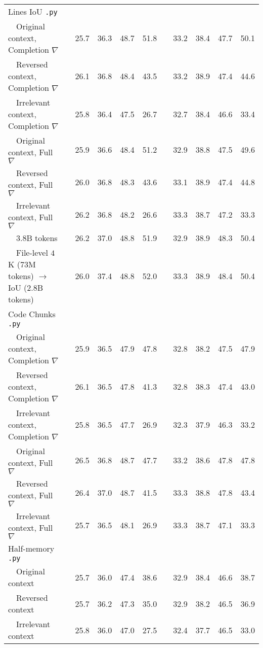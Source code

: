 \begin{table}[H]
{\begin{tabular}{lc cc>{\columncolor{gray!30}}cc c cc>{\columncolor{gray!30}}cc}
    \midrule
    Lines IoU \texttt{.py} & & & & & & & & & & \\
    ~~Original context, Completion $\nabla$ & & 25.7 & 36.3 & 48.7 & 51.8 & & 33.2 & 38.4 & 47.7 & 50.1 \\
    ~~Reversed context, Completion $\nabla$ & & 26.1 & 36.8 & 48.4 & 43.5 & & 33.2 & 38.9 & 47.4 & 44.6 \\
    ~~Irrelevant context, Completion $\nabla$ & & 25.8 & 36.4 & 47.5 & 26.7 & & 32.7 & 38.4 & 46.6 & 33.4 \\
    ~~Original context, Full $\nabla$ & & 25.9 & 36.6 & 48.4 & 51.2 & & 32.9 & 38.8 & 47.5 & 49.6 \\
    ~~Reversed context, Full $\nabla$ & & 26.0 & 36.8 & 48.3 & 43.6 & & 33.1 & 38.9 & 47.4 & 44.8 \\
    ~~Irrelevant context, Full $\nabla$ & & 26.2 & 36.8 & 48.2 & 26.6 & & 33.3 & 38.7 & 47.2 & 33.3 \\
    ~~$3.8$B tokens & & 26.2 & 37.0 & 48.8 & 51.9 & & 32.9 & 38.9 & 48.3 & 50.4 \\
    ~~File-level $4$K ($73$M tokens) $\rightarrow$ IoU ($2.8$B tokens) & & 26.0 & 37.4 & 48.8 & 52.0 & & 33.3 & 38.9 & 48.4 & 50.4 \\
    
    \midrule
    Code Chunks \texttt{.py} & & & & & & & & & & \\
    ~~Original context, Completion $\nabla$ & & 25.9 & 36.5 & 47.9 & 47.8 & & 32.8 & 38.2 & 47.5 & 47.9 \\
    ~~Reversed context, Completion $\nabla$ & & 26.1 & 36.5 & 47.8 & 41.3 & & 32.8 & 38.3 & 47.4 & 43.0 \\
    ~~Irrelevant context, Completion $\nabla$ & & 25.8 & 36.5 & 47.7 & 26.9 & & 32.3 & 37.9 & 46.3 & 33.2 \\
    ~~Original context, Full $\nabla$ & & 26.5 & 36.8 & 48.7 & 47.7 & & 33.2 & 38.6 & 47.8 & 47.8 \\
    ~~Reversed context, Full $\nabla$ & & 26.4 & 37.0 & 48.7 & 41.5 & & 33.3 & 38.8 & 47.8 & 43.4 \\
    ~~Irrelevant context, Full $\nabla$ & & 25.7 & 36.5 & 48.1 & 26.9 & & 33.3 & 38.7 & 47.1 & 33.3 \\
    
    \midrule
    Half-memory \texttt{.py} & & & & & & & & & & \\
    ~~Original context & & 25.7 & 36.0 & 47.4 & 38.6 & & 32.9 & 38.4 & 46.6 & 38.7 \\
    ~~Reversed context & & 25.7 & 36.2 & 47.3 & 35.0 & & 32.9 & 38.2 & 46.5 & 36.9 \\
    ~~Irrelevant context & & 25.8 & 36.0 & 47.0 & 27.5 & & 32.4 & 37.7 & 46.5 & 33.0 \\
    

\end{tabular}}
\end{table}

